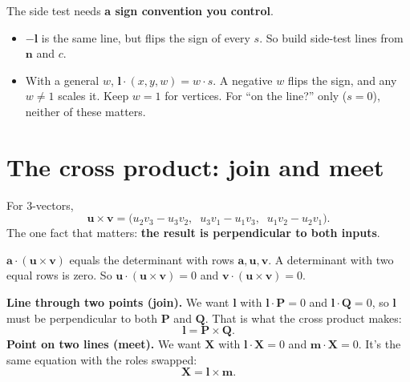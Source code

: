 \documentclass[11pt,a4paper]{article}
\newcommand{\vect}[1]{\mathbf{#1}}
\newcommand{\vP}{\vect{P}}
\newcommand{\vQ}{\vect{Q}}
\newcommand{\vl}{\vect{l}}
\newcommand{\vm}{\vect{m}}
\newcommand{\vX}{\vect{X}}
\begin{document}
\begin{watchbox}
The side test needs \textbf{a sign convention you control}.
\begin{itemize}
\item $-\vl$ is the same line, but flips the sign of every $s$. So build side-test lines from $\vect{n}$ and $c$.
\item With a general $w$, $\vl\cdot(x,y,w)=w\cdot s$. A negative $w$ flips the sign, and any $w\neq1$ scales it. Keep $w=1$ for
vertices. For ``on the line?'' only ($s=0$), neither of these matters.
\end{itemize}
\end{watchbox}

\section{The cross product: join and meet}\label{sec:cross}

For 3-vectors,
\[
\vect{u}\times\vect{v}=\big(u_2v_3-u_3v_2,\;\;u_3v_1-u_1v_3,\;\;u_1v_2-u_2v_1\big).
\]
The one fact that matters: \textbf{the result is perpendicular to both inputs}.
\begin{whybox}
$\vect{a}\cdot(\vect{u}\times\vect{v})$ equals the determinant with rows $\vect{a},\vect{u},\vect{v}$. A determinant with two equal
rows is zero. So $\vect{u}\cdot(\vect{u}\times\vect{v})=0$ and $\vect{v}\cdot(\vect{u}\times\vect{v})=0$.
\end{whybox}

\textbf{Line through two points (join).} We want $\vl$ with $\vl\cdot\vP=0$ and $\vl\cdot\vQ=0$, so $\vl$ must be perpendicular
to both $\vP$ and $\vQ$. That is what the cross product makes:
\[
\vl=\vP\times\vQ .
\]
\textbf{Point on two lines (meet).} We want $\vX$ with $\vl\cdot\vX=0$ and $\vm\cdot\vX=0$. It's the same equation with the
roles swapped:
\[
\vX=\vl\times\vm .
\]

\begin{center}
\end{center}
\end{document}

